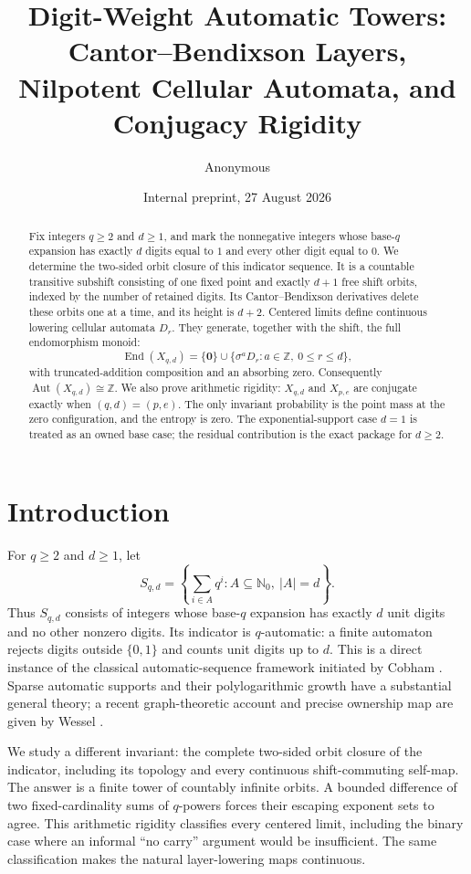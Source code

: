 \documentclass[11pt,a4paper]{amsart}
\title[Digit-weight automatic towers]{Digit-Weight Automatic Towers:\\
Cantor--Bendixson Layers, Nilpotent Cellular Automata, and Conjugacy Rigidity}
\author{Anonymous}
\date{Internal preprint, 27 August 2026}
\theoremstyle{definition}
\theoremstyle{remark}
\newcommand{\N}{\mathbb N}
\newcommand{\Z}{\mathbb Z}
\newcommand{\End}{\operatorname{End}}
\newcommand{\Aut}{\operatorname{Aut}}
\newcommand{\zz}{\mathbf 0}
\begin{document}
\begin{abstract}
Fix integers $q\geq2$ and $d\geq1$, and mark the nonnegative integers whose
base-$q$ expansion has exactly $d$ digits equal to $1$ and every other digit
equal to $0$.  We determine the two-sided orbit closure of this indicator
sequence.  It is a countable transitive subshift consisting of one fixed
point and exactly $d+1$ free shift orbits, indexed by the number of retained
digits.  Its Cantor--Bendixson derivatives delete these orbits one at a time,
and its height is $d+2$.  Centered limits define continuous lowering cellular
automata $D_r$.  They generate, together with the shift, the full
endomorphism monoid:
\[
 \End(X_{q,d})=\{\zz\}\cup
 \{\sigma^aD_r:a\in\Z,\ 0\leq r\leq d\},
\]
with truncated-addition composition and an absorbing zero.  Consequently
$\Aut(X_{q,d})\cong\Z$.  We also prove arithmetic rigidity:
$X_{q,d}$ and $X_{p,e}$ are conjugate exactly when $(q,d)=(p,e)$.  The only
invariant probability is the point mass at the zero configuration, and the
entropy is zero.  The exponential-support case $d=1$ is treated as an owned
base case; the residual contribution is the exact package for $d\geq2$.
\end{abstract}

\maketitle

\section{Introduction}

For $q\geq2$ and $d\geq1$, let
\[
 S_{q,d}=\left\{\sum_{i\in A}q^i:
 A\subseteq\N_0,\ |A|=d\right\}.
\]
Thus $S_{q,d}$ consists of integers whose base-$q$ expansion has exactly
$d$ unit digits and no other nonzero digits.  Its indicator is $q$-automatic:
a finite automaton rejects digits outside $\{0,1\}$ and counts unit digits up
to $d$.  This is a direct instance of the classical automatic-sequence
framework initiated by Cobham \cite{Cobham1972}.  Sparse automatic supports
and their polylogarithmic growth have a substantial general theory; a recent
graph-theoretic account and precise ownership map are given by Wessel
\cite{Wessel2025}.

We study a different invariant: the complete two-sided orbit closure of the
indicator, including its topology and every continuous shift-commuting
self-map.  The answer is a finite tower of countably infinite orbits.  A
bounded difference of two fixed-cardinality sums of $q$-powers forces their
escaping exponent sets to agree.  This arithmetic rigidity classifies every
centered limit, including the binary case where an informal ``no carry''
argument would be insufficient.  The same classification makes the natural
layer-lowering maps continuous.
\end{document}

